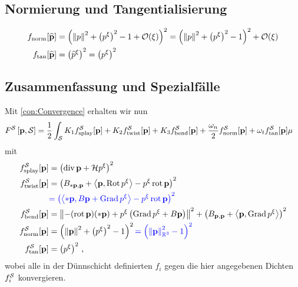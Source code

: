 \documentclass[a4paper,11pt]{scrartcl}
\newcommand{\landau}{\mathcal{O}}
\begin{document}
\subsection{Normierung und Tangentialisierung}
\begin{align}
  f_{\text{norm}}[\pExt] &= \left( \left\| p \right\|^{2} + \left( p^{\xi} \right)^{2} - 1 +\landau(\xi) \right)^{2} 
                          = \left( \left\| p \right\|^{2} + \left( p^{\xi} \right)^{2} - 1  \right)^{2}+\landau(\xi)\\
  f_{\text{tan}}[\pExt] &= \left( \pIExt^{\xi} \right)^{2} = \left( p^{\xi} \right)^{2}
\end{align}


\subsection{Zusammenfassung und Spezialfälle}
Mit \autoref{con:Convergence} erhalten wir nun
\begin{align}
    F^{\mathcal{S}}\left[ \mathbf{p}, \mathcal{S} \right] 
        &= \frac{1}{2}\int_{\mathcal{S}} {K_1} f^{\mathcal{S}}_{\text{splay}}[\mathbf{p}] + {K_2} f^{\mathcal{S}}_{\text{twist}}[\mathbf{p}] +  {K_3}
        f^{\mathcal{S}}_{\text{bend}}[\mathbf{p}]
                                    +\frac{{\omega_n}}{2}f^{\mathcal{S}}_{\text{norm}}[\mathbf{p}] + {\omega_t} f^{\mathcal{S}}_{\text{tan}}[\mathbf{p}]\mu
\end{align}
mit
\begin{align}
  f^{\mathcal{S}}_{\text{splay}}[\mathbf{p}] &= \left( \operatorname{div}{\mathbf{p}} + \mathcal{H} p^{\xi} \right)^{2} \\
  f^{\mathcal{S}}_{\text{twist}}[\mathbf{p}] &= \left( B_{*\mathbf{p},\mathbf{p}} + \left\langle \mathbf{p}, \operatorname{Rot} p^{\xi} \right\rangle - p^{\xi}\operatorname{rot}\mathbf{p} \right)^{2}\\
                          &{\color{blue}= \left(  \left\langle *\mathbf{p}, B\mathbf{p} + \operatorname{Grad} p^{\xi} \right\rangle - p^{\xi}\operatorname{rot}\mathbf{p} \right)^{2}}\\
  f^{\mathcal{S}}_{\text{bend}}[\mathbf{p}]  &= \left\| -(\operatorname{rot}\mathbf{p})(*\mathbf{p}) + p^{\xi}\left( \operatorname{Grad} p^{\xi} + B\mathbf{p} \right) \right\|^{2}
                              + \left( B_{\mathbf{p},\mathbf{p}} + \left\langle \mathbf{p}, \operatorname{Grad} p^{\xi} \right\rangle\right)^{2}\\
  f^{\mathcal{S}}_{\text{norm}}[\mathbf{p}]  &= \left( \left\| \mathbf{p} \right\|^{2} + \left( p^{\xi} \right)^{2} - 1  \right)^{2} 
                          {\color{blue}=\left( \left\| \mathbf{p} \right\|^{2}_{\mathbb{R}^{3}}  - 1  \right)^{2} }\\
  f^{\mathcal{S}}_{\text{tan}}[\mathbf{p}]   &= \left( p^{\xi} \right)^{2} \,\text{,}
\end{align}
wobei alle in der Dünnschicht definierten \( f_{i} \) gegen die hier angegebenen Dichten \( f^{\mathcal{S}}_{i} \) konvergieren.
\end{document}
